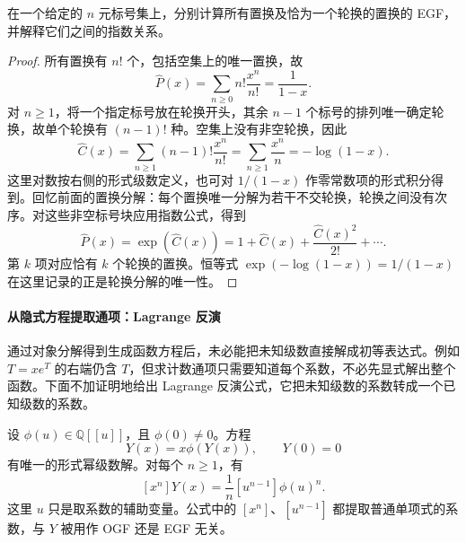 \documentclass[lang=cn,a4paper,fontset=none,zihao=false,10pt,openany,twoside]{beautybook}
\numberwithin{algorithm}{chapter}
\newcommand{\Q}{\mathbb Q}
\begin{document}
\begin{example}[置换是轮换的无序集合]\label{ex:permutation-cycle-egf}
在一个给定的 $n$ 元标号集上，分别计算所有置换及恰为一个轮换的置换的 EGF，并解释它们之间的指数关系。
\end{example}
\begin{proof}
所有置换有 $n!$ 个，包括空集上的唯一置换，故
\[
 \widehat P(x)=\sum_{n\ge0}n!\frac{x^n}{n!}=\frac1{1-x}.
\]
对 $n\ge1$，将一个指定标号放在轮换开头，其余 $n-1$ 个标号的排列唯一确定轮换，故单个轮换有 $(n-1)!$ 种。空集上没有非空轮换，因此
\[
 \widehat C(x)=\sum_{n\ge1}(n-1)!\frac{x^n}{n!}
 =\sum_{n\ge1}\frac{x^n}{n}=-\log(1-x).
\]
这里对数按右侧的形式级数定义，也可对 $1/(1-x)$ 作零常数项的形式积分得到。回忆前面的置换分解：每个置换唯一分解为若干不交轮换，轮换之间没有次序。对这些非空标号块应用指数公式，得到
\[
 \widehat P(x)=\exp(\widehat C(x))
 =1+\widehat C(x)+\frac{\widehat C(x)^2}{2!}+\cdots.
\]
第 $k$ 项对应恰有 $k$ 个轮换的置换。恒等式 $\exp(-\log(1-x))=1/(1-x)$ 在这里记录的正是轮换分解的唯一性。
\end{proof}

\paragraph{从隐式方程提取通项：Lagrange 反演}
通过对象分解得到生成函数方程后，未必能把未知级数直接解成初等表达式。例如 $T=xe^T$ 的右端仍含 $T$，但求计数通项只需要知道每个系数，不必先显式解出整个函数。下面不加证明地给出 Lagrange 反演公式，它把未知级数的系数转成一个已知级数的系数。

\begin{theorem}\label{thm:lagrange-inversion}
设 $\phi(u)\in\Q[[u]]$，且 $\phi(0)\ne0$。方程
\[
 Y(x)=x\phi(Y(x)),\qquad Y(0)=0
\]
有唯一的形式幂级数解。对每个 $n\ge1$，有
\[
 [x^n]Y(x)=\frac1n[u^{n-1}]\phi(u)^n.
\]
这里 $u$ 只是取系数的辅助变量。公式中的 $[x^n]$、$[u^{n-1}]$ 都提取普通单项式的系数，与 $Y$ 被用作 OGF 还是 EGF 无关。
\end{theorem}
\end{document}
